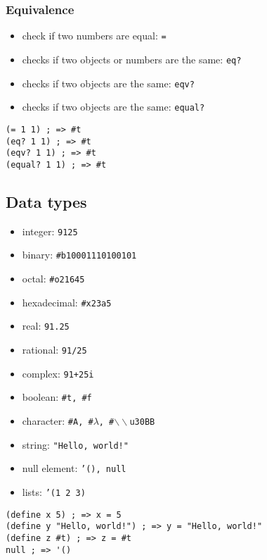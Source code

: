 \documentclass[a4paper,landscape,10pt]{article}
\begin{document}
\begin{multicols*}{2}
  \switchcolumn

  \subsubsection{Equivalence}

  \begin{itemize}
    \item check if two numbers are equal: \texttt{=}
    \item checks if two objects or numbers are the same: \texttt{eq?}
    \item checks if two objects are the same: \texttt{eqv?}
    \item checks if two objects are the same: \texttt{equal?}
  \end{itemize}

  \begin{lstlisting}[language=Racket]
(= 1 1) ; => #t
(eq? 1 1) ; => #t
(eqv? 1 1) ; => #t
(equal? 1 1) ; => #t
\end{lstlisting}

  \subsection{Data types}

  \begin{itemize}
    \item integer: \texttt{9125}
    \item binary: \texttt{\#b10001110100101}
    \item octal: \texttt{\#o21645}
    \item hexadecimal: \texttt{\#x23a5}
    \item real: \texttt{91.25}
    \item rational: \texttt{91/25}
    \item complex: \texttt{91+25i}
    \item boolean: \texttt{\#t, \#f}
    \item character: \texttt{\#A, \#\(\lambda\), \#\(\backslash\backslash\)u30BB}
    \item string: \texttt{"Hello, world!"}
    \item null element: \texttt{'(), null}
    \item lists: \texttt{'(1 2 3)}
  \end{itemize}

  \begin{lstlisting}[language=Racket]
(define x 5) ; => x = 5
(define y "Hello, world!") ; => y = "Hello, world!"
(define z #t) ; => z = #t
null ; => '()
\end{lstlisting}


\end{multicols*}
\end{document}
